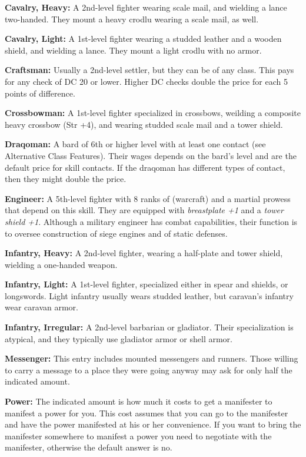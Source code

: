 \textbf{Cavalry, Heavy:} A 2nd-level fighter wearing scale mail, and wielding a lance two-handed. They mount a heavy crodlu wearing a scale mail, as well.

\textbf{Cavalry, Light:} A 1st-level fighter wearing a studded leather and a wooden shield, and wielding a lance. They mount a light crodlu with no armor.

\textbf{Craftsman:} Usually a 2nd-level settler, but they can be of any class. This pays for any  check of DC 20 or lower. Higher DC checks double the price for each 5 points of difference. 

\textbf{Crossbowman:} A 1st-level fighter specialized in crossbows, weilding a composite heavy crossbow (Str +4), and wearing studded scale mail and a tower shield.

\textbf{Draqoman:} A bard of 6th or higher level with at least one contact (see Alternative Class Features). Their wages depends on the bard's level and are the default price for skill contacts. If the draqoman has different types of contact, then they might double the price.

\textbf{Engineer:} A 5th-level fighter with 8 ranks of  (warcraft) and a martial prowess that depend on this skill. They are equipped with \emph{breastplate +1} and a \emph{tower shield +1}. Although a military engineer has combat capabilities, their function is to oversee construction of siege engines and of static defenses.

\textbf{Infantry, Heavy:} A 2nd-level fighter, wearing a half-plate and tower shield, wielding a one-handed weapon. 

\textbf{Infantry, Light:} A 1st-level fighter, specialized either in spear and shields, or longswords. Light infantry usually wears studded leather, but caravan's infantry wear caravan armor.

\textbf{Infantry, Irregular:} A 2nd-level barbarian or gladiator. Their specialization is atypical, and they typically use gladiator armor or shell armor.

\textbf{Messenger:} This entry includes mounted messengers and runners. Those willing to carry a message to a place they were going anyway may ask for only half the indicated amount.

\textbf{Power:} The indicated amount is how much it costs to get a manifester to manifest a power for you. This cost assumes that you can go to the manifester and have the power manifested at his or her convenience. If you want to bring the manifester somewhere to manifest a power you need to negotiate with the manifester, otherwise the default answer is no.

